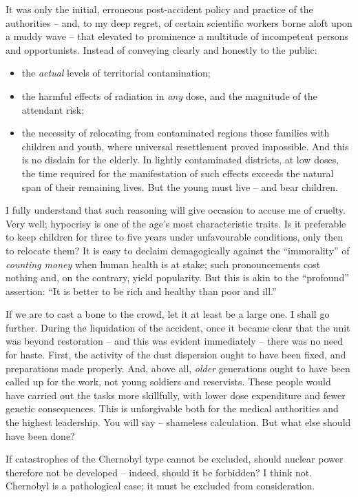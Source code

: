 \documentclass[openright]{bookest}
\begin{document}
It was only the initial, erroneous post-accident policy and practice of the authorities -- and, to my deep regret, of certain scientific workers borne aloft upon a muddy wave -- that elevated to prominence a multitude of incompetent persons and opportunists. Instead of conveying clearly and honestly to the public:
\begin{itemize}
  \item the \textit{actual} levels of territorial contamination;
  \item the harmful effects of radiation in \textit{any} dose, and the magnitude of the attendant risk;
  \item the necessity of relocating from contaminated regions those families with children and youth, where universal resettlement proved impossible. And this is no disdain for the elderly. In lightly contaminated districts, at low doses, the time required for the manifestation of such effects exceeds the natural span of their remaining lives. But the young must live -- and bear children.
\end{itemize}

I fully understand that such reasoning will give occasion to accuse me of cruelty. Very well; hypocrisy is one of the age's most characteristic traits. Is it preferable to keep children for three to five years under unfavourable conditions, only then to relocate them? It is easy to declaim demagogically against the ``immorality'' of \textit{counting money} when human health is at stake; such pronouncements cost nothing and, on the contrary, yield popularity. But this is akin to the ``profound'' assertion: ``It is better to be rich and healthy than poor and ill.''

If we are to cast a bone to the crowd, let it at least be a large one. I shall go further. During the liquidation of the accident, once it became clear that the unit was beyond restoration -- and this was evident immediately -- there was no need for haste. First, the activity of the dust dispersion ought to have been fixed, and preparations made properly. And, above all, \textit{older} generations ought to have been called up for the work, not young soldiers and reservists. These people would have carried out the tasks more skillfully, with lower dose expenditure and fewer genetic consequences. This is unforgivable both for the medical authorities and the highest leadership. You will say -- shameless calculation. But what else should have been done?

If catastrophes of the Chernobyl type cannot be excluded, should nuclear power therefore not be developed -- indeed, should it be forbidden? I think not. Chernobyl is a pathological case; it must be excluded from consideration.
\end{document}
